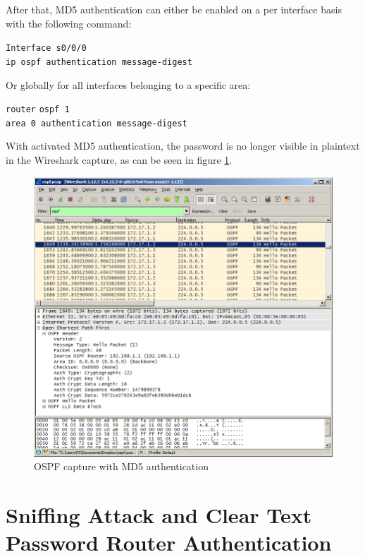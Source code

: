 After that, MD5 authentication can either be enabled on a per interface basis with the following command:
\begin{tabbing}
\texttt{Interf}\= \texttt{ace s0/0/0} \\
\> \texttt{ip ospf authentication message-digest}
\end{tabbing}
   
Or globally for all interfaces belonging to a specific area:
\begin{tabbing}
\texttt{router} \= \texttt{ospf 1} \\
\> \texttt{area 0 authentication message-digest}
\end{tabbing}

With activated MD5 authentication, the password is no longer visible in plaintext in the Wireshark capture, as can be seen in figure \ref{img:OSPF_MD5}.

\begin{figure}[H]
	\centering
	\includegraphics[width=1.0\textwidth]{img/wireshark_md5.png}
	\caption{OSPF capture with MD5 authentication}
	\label{img:OSPF_MD5}
\end{figure}


\chapter{Sniffing Attack and Clear Text Password Router Authentication}

